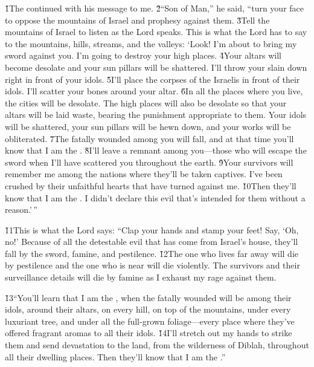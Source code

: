 \v{1}The  continued with his message to me. \v{2}``Son of Man,'' he said, ``turn your face to oppose the mountains of Israel and prophesy against them. \v{3}Tell the mountains of Israel to listen as the Lord  speaks. This is what the Lord  has to say to the mountains, hills, streams, and the valleys: `Look! I'm about to bring my sword against you. I'm going to destroy your high places. \v{4}Your altars will become desolate and your sun pillars will be shattered. I'll throw your slain down right in front of your idols. \v{5}I'll place the corpses of the Israelis in front of their idols. I'll scatter your bones around your altar. \v{6}In all the places where you live, the cities will be desolate. The high places will also be desolate so that your altars will be laid waste, bearing the punishment appropriate to them. Your idols will be shattered, your sun pillars will be hewn down, and your works will be obliterated. \v{7}The fatally wounded among you will fall, and at that time you'll know that I am the . \v{8}I'll leave a remnant among you---those who will escape the sword when I'll have scattered you throughout the earth. \v{9}Your survivors will remember me among the nations where they'll be taken captives. I've been crushed by their unfaithful hearts that have turned against me. \v{10}Then they'll know that I am the . I didn't declare this evil that's intended for them without a reason.'\,''

\v{11}This is what the Lord  says: ``Clap your hands and stamp your feet! Say, `Oh, no!' Because of all the detestable evil that has come from Israel's house, they'll fall by the sword, famine, and pestilence. \v{12}The one who lives far away will die by pestilence and the one who is near will die violently. The survivors and their surveillance details will die by famine as I exhaust my rage against them.

\v{13}``You'll learn that I am the , when the fatally wounded will be among their idols, around their altars, on every hill, on top of the mountains, under every luxuriant tree, and under all the full-grown foliage---every place where they've offered fragrant aromas to all their idols. \v{14}I'll stretch out my hands to strike them and send devastation to the land, from the wilderness of Diblah, throughout all their dwelling places. Then they'll know that I am the .''

